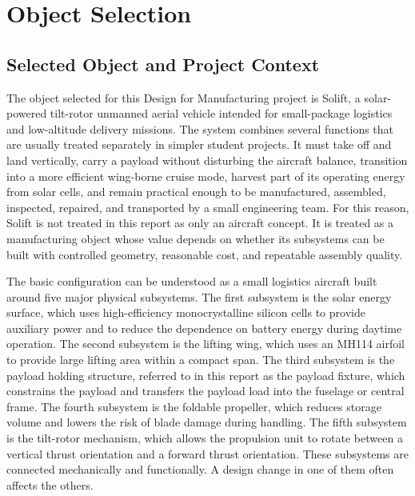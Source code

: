 \chapter{Object Selection}
\label{sec:object-selection}

\section{Selected Object and Project Context}
\label{subsec:selected-object}

The object selected for this Design for Manufacturing project is Solift, a solar-powered tilt-rotor unmanned aerial vehicle intended for small-package logistics and low-altitude delivery missions. The system combines several functions that are usually treated separately in simpler student projects. It must take off and land vertically, carry a payload without disturbing the aircraft balance, transition into a more efficient wing-borne cruise mode, harvest part of its operating energy from solar cells, and remain practical enough to be manufactured, assembled, inspected, repaired, and transported by a small engineering team. For this reason, Solift is not treated in this report as only an aircraft concept. It is treated as a manufacturing object whose value depends on whether its subsystems can be built with controlled geometry, reasonable cost, and repeatable assembly quality.

The basic configuration can be understood as a small logistics aircraft built around five major physical subsystems. The first subsystem is the solar energy surface, which uses high-efficiency monocrystalline silicon cells to provide auxiliary power and to reduce the dependence on battery energy during daytime operation. The second subsystem is the lifting wing, which uses an MH114 airfoil to provide large lifting area within a compact span. The third subsystem is the payload holding structure, referred to in this report as the payload fixture, which constrains the payload and transfers the payload load into the fuselage or central frame. The fourth subsystem is the foldable propeller, which reduces storage volume and lowers the risk of blade damage during handling. The fifth subsystem is the tilt-rotor mechanism, which allows the propulsion unit to rotate between a vertical thrust orientation and a forward thrust orientation. These subsystems are connected mechanically and functionally. A design change in one of them often affects the others.

